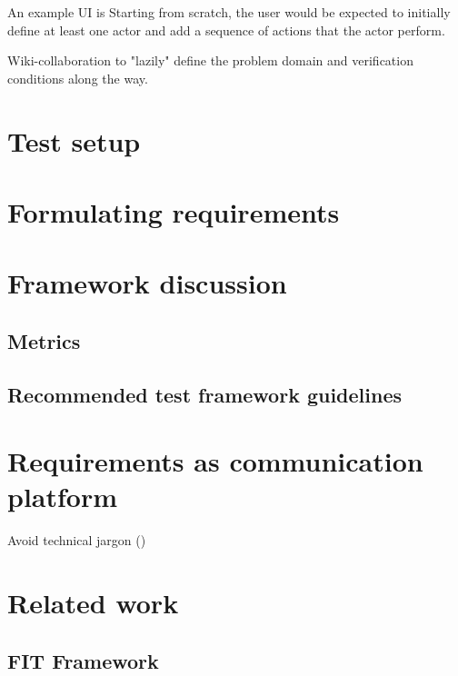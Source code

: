 
An example UI is Starting from scratch, the user would be expected to initially define at least one actor and add a sequence of actions that the actor perform.

Wiki-collaboration to "lazily" define the problem domain and verification conditions along the way.

\section{Test setup}

\section{Formulating requirements}

\section{Framework discussion}
\subsection{Metrics}
\subsection{Recommended test framework guidelines}

\section{Requirements as communication platform}

Avoid technical jargon (\cite{christel1992issues})

\section{Related work}
\subsection{FIT Framework}

